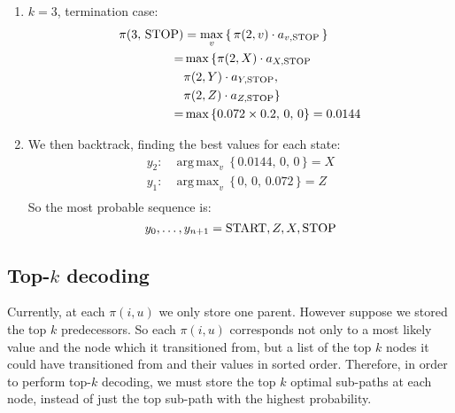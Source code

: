 \documentclass[9pt,twocolumn]{article}
\DeclareMathOperator*{\argmax}{arg\,max}
\newcommand{\START}{\text{\lstinline{START}}}
\newcommand{\STOP}{\text{\lstinline{STOP}}}
\begin{document}
\begin{enumerate}
                \item
                    $k=3$, termination case:
                    \begin{equation}
                    \begin{split}
                        \pi(3,\,\STOP) & = \max_v \,\{\,\pi(2,v) \cdot a_{v, \STOP}\,\}\\
                        = & \max\,\{\pi(2,X) \cdot a_{X, \STOP}\\
                        & \pi(2,Y) \cdot a_{Y, \STOP},\\
                        &\pi(2,Z) \cdot a_{Z, \STOP}\}\\
                        = & \max\,\{0.072\times0.2,\,0,\,0\}
                        = 0.0144
                    \end{split}
                    \end{equation}

                \item
                    We then backtrack, finding the best values for each state:
                    \begin{equation}
                    \begin{split}
                        y_2: & \argmax_v\,\{\, 0.0144,\,0,\,0 \,\} = X \\
                        y_1: & \argmax_v\,\{\, 0,\,0,\,0.072 \,\} = Z \\
                    \end{split}
                    \end{equation}
                    So the most probable sequence is:
                    \begin{equation}
                        y_0,\ldots, y_{n+1}=\START,Z,X,\STOP
                    \end{equation}
            \end{enumerate}

        \subsection*{Top-$k$ decoding}
            Currently, at each $\pi(i,u)$ we only store one parent. However suppose we stored the top $k$ predecessors. So each $\pi(i,u)$ corresponds not only to a most likely value and the node which it transitioned from, but a list of the top $k$ nodes it could have transitioned from and their values in sorted order. Therefore, in order to perform top-$k$ decoding, we must store the top $k$ optimal sub-paths at each node, instead of just the top sub-path with the highest probability. 
\end{document}
